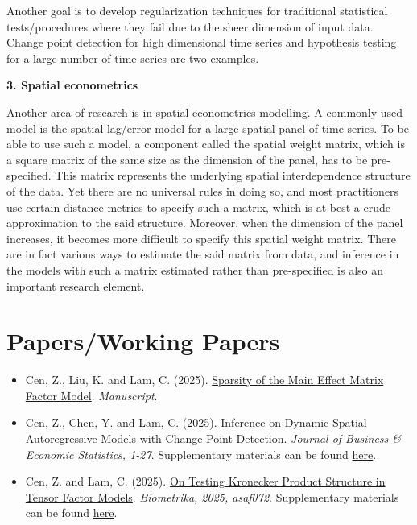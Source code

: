 \documentclass[overlapped,line,letterpaper]{res}
\begin{document}
\begin{resume}
Another goal is to develop regularization techniques for traditional statistical tests/procedures where they fail due to the sheer dimension of input data. Change point detection for high dimensional time series and hypothesis testing for a large number of time series are two examples.

{\bf 3. Spatial econometrics}

Another area of research is in spatial econometrics modelling. A commonly used model is the spatial lag/error model for a large spatial panel of time series. To be able to use such a model, a component called the spatial weight matrix, which is a square matrix of the same size as the dimension of the panel, has to be pre-specified. This matrix represents the underlying spatial interdependence structure of the data. Yet there are no universal rules in doing so, and most practitioners use certain distance metrics to specify such a matrix, which is at best a crude approximation to the said structure. Moreover, when the dimension of the panel increases, it becomes more difficult to specify this spatial weight matrix. There are in fact various ways to estimate the said matrix from data, and inference in the models with such a matrix estimated rather than pre-specified is also an important research element.






\section{Papers/Working Papers}
\begin{itemize}
\item[$\bullet$] Cen, Z., Liu, K. and Lam, C. (2025).
\href{https://cliffordlam.github.io/files/SMEFM_sparse_factor_model.pdf}{Sparsity of the Main Effect Matrix Factor Model}. {\em Manuscript}.

\item[$\bullet$] Cen, Z., Chen, Y. and Lam, C. (2025). \href{https://cliffordlam.github.io/files/spatial_ar_change.pdf}{Inference on Dynamic Spatial Autoregressive Models with Change Point Detection}. {\em Journal of Business \& Economic Statistics, 1-27}. Supplementary materials can be found \href{https://cliffordlam.github.io/files/Supp-Splassovc.pdf}{here}.



\item[$\bullet$] Cen, Z. and Lam, C. (2025). \href{https://cliffordlam.github.io/files/KOFM_v1_main.pdf}{On Testing Kronecker Product Structure in Tensor Factor Models}. {\em Biometrika, 2025, asaf072}. Supplementary materials can be found \href{https://cliffordlam.github.io/files/KOFM_v1_supp.pdf}{here}.




\end{itemize}
\end{resume}
\end{document}
